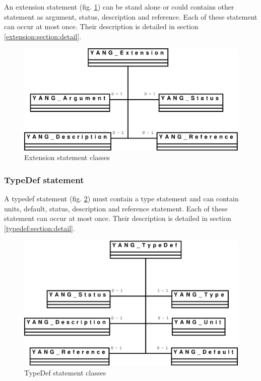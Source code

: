 \documentclass[a4paper]{article}
\begin{document}
An extension  statement (fig.  \ref{extension}) can be  stand alone or
could contains  other statement  as argument, status,  description and
reference.  Each  of these  statement can occur  at most  once.  Their
description is detailed in section \ref{extension:section:detail}.
\begin{figure}[htbp]
\begin{center}
\includegraphics[scale = .3]{extension.eps}
\end{center}
\caption{Extension statement classes}
\label{extension}
\end{figure}

\subsubsection{TypeDef statement}
\label{typedef:section:global}

A  typedef  statement  (fig.    \ref{typedef})  must  contain  a  type
statement  and can  contain  units, default,  status, description  and
reference statement.  Each of these  statement can occur at most once.
Their description is detailed in section \ref{typedef:section:detail}.
\begin{figure}[htbp]
\begin{center}
\includegraphics[scale = .3]{typedef.eps}
\end{center}
\caption{TypeDef statement classes}
\label{typedef}
\end{figure}
\end{document}
